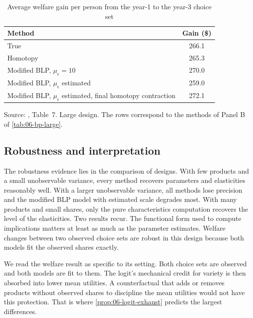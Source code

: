 \begin{table}[htbp]
\centering
\caption{Average welfare gain per person from the year-1 to the year-3 choice set}
\label{tab:06-bp-welfare}
\small
\begin{tabular}{@{}lc@{}}
\toprule
Method & Gain (\$) \\
\midrule
True & 266.1 \\
Homotopy & 265.3 \\
Modified BLP, $\mu_\epsilon = 10$ & 270.0 \\
Modified BLP, $\mu_\epsilon$ estimated & 259.0 \\
Modified BLP, $\mu_\epsilon$ estimated, final homotopy contraction & 272.1 \\
\bottomrule
\end{tabular}

\smallskip
\begin{minipage}{0.75\textwidth}
\footnotesize Source: \citet{BerryPakes2007}, Table~7. Large design. The rows correspond to the methods of Panel B of
\cref{tab:06-bp-large}.
\end{minipage}
\end{table}

\subsection{Robustness and interpretation}\label{sec:06-bp-interpret}

The robustness evidence lies in the comparison of designs. With few products and a small unobservable variance, every
method recovers parameters and elasticities reasonably well. With a larger unobservable variance, all methods lose
precision and the modified BLP model with estimated scale degrades most. With many products and small shares, only the
pure characteristics computation recovers the level of the elasticities. Two results recur. The functional form used to
compute implications matters at least as much as the parameter estimates. Welfare changes between two observed choice
sets are robust in this design because both models fit the observed shares exactly.

We read the welfare result as specific to its setting. Both choice sets are observed and both models are fit to them.
The logit's mechanical credit for variety is then absorbed into lower mean utilities. A counterfactual that adds or
removes products without observed shares to discipline the mean utilities would not have this protection. That is where
\cref{prop:06-logit-exhaust} predicts the largest differences.


